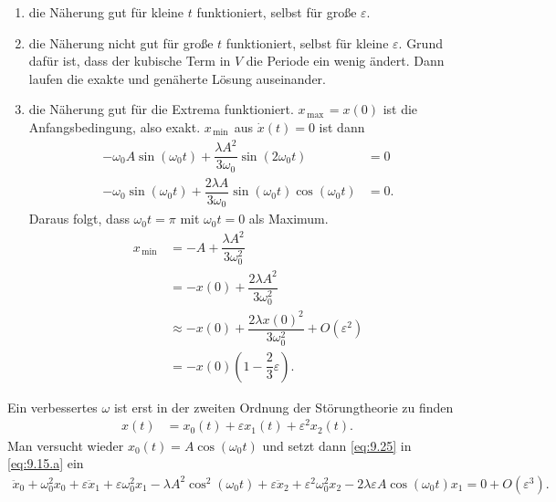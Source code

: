 \documentclass[a4paper,12pt]{article}
\numberwithin{equation}{section}
\begin{document}
\begin{enumerate}[label=$\circ$]
        \item die Näherung gut für kleine $t$ funktioniert, selbst für große $\varepsilon $.
        \item die Näherung nicht gut für große $t$ funktioniert, selbst für kleine $\varepsilon $. Grund dafür ist, dass der kubische Term in $V$ die Periode ein wenig ändert. Dann laufen die exakte und genäherte Lösung auseinander.
        \item die Näherung gut für die Extrema funktioniert. $x_{\,\text{max}\,}=x\left(0\right)$ ist die Anfangsbedingung, also exakt. $x_{\,\text{min}\,}$ aus $\dot{x}\left(t\right)=0$ ist dann
                \begin{align} 
                        -\omega _0A\sin \left(\omega _0t\right)+\dfrac{\lambda A^2}{3\omega _0}\sin \left(2\omega _0t\right)&=0\nonumber \\
                        -\omega _0\sin \left(\omega _0t\right)+\dfrac{2\lambda A}{3\omega _0}\sin \left(\omega _0t\right)\cos \left(\omega _0t\right)&=0\nonumber 
                .\end{align} 
                Daraus folgt, dass $\omega _0t=\pi $ mit $\omega _0t=0$ als Maximum.
                \begin{align} 
                        x_{\,\text{min}\,}&=-A+\dfrac{\lambda A^2}{3\omega _0^2}\nonumber \\
                                          &=-x\left(0\right)+\dfrac{2\lambda A^2}{3\omega _0^2}\nonumber \\
                                          &\approx -x\left(0\right)+\dfrac{2\lambda x\left(0\right)^2}{3\omega _0^2}+O\left(\varepsilon ^2\right)\nonumber \\
                                          &=-x\left(0\right)\left(1-\dfrac{2}{3}\varepsilon \right)\label{eq:9.24}
                .\end{align} 
\end{enumerate}
Ein verbessertes $\omega $ ist erst in der zweiten Ordnung der Störungtheorie zu finden
\begin{align} 
        x\left(t\right)&=x_0\left(t\right)+\varepsilon x_1\left(t\right)+\varepsilon ^2x_2\left(t\right)\label{eq:9.25}
.\end{align} 
Man versucht wieder $x_0\left(t\right)=A\cos \left(\omega _0t\right)$ und setzt dann \eqref{eq:9.25} in \eqref{eq:9.15.a} ein
\begin{align} 
        \ddot{x}_0+\omega _0^2x_0+\varepsilon \ddot{x}_1+\varepsilon \omega _0^2x_1-\lambda A^2\cos ^2\left(\omega _0t\right)+\varepsilon \ddot{x}_2+\varepsilon ^2\omega _0^2x_2-2\lambda \varepsilon A\cos \left(\omega _0t\right)x_1=0+O\left(\varepsilon ^3\right)\nonumber 
.\end{align} 
\end{document}
